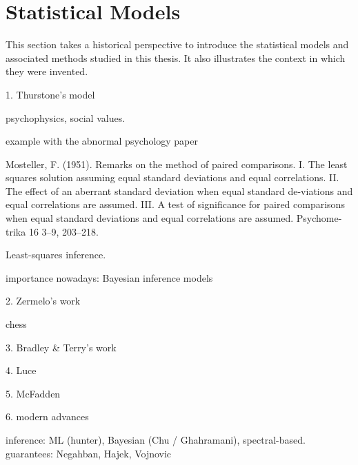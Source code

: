 \section{Statistical Models}
\label{in:sec:models}

This section takes a historical perspective to introduce the statistical models and associated methods studied in this thesis.
It also illustrates the context in which they were invented.

1. Thurstone's model

psychophysics, social values.

example with the abnormal psychology paper

Mosteller, F.
(1951). Remarks on the method of paired
comparisons. I. The least squares solution assuming equal
standard deviations and equal correlations. II. The effect
of an aberrant standard deviation when equal standard de-viations and equal correlations are assumed. III. A test of
significance for paired comparisons when equal standard
deviations and equal correlations are assumed.
Psychome-
trika
16
3–9, 203–218.

Least-squares inference.

importance nowadays: Bayesian inference models

2. Zermelo's work

chess

3. Bradley \& Terry's work

4. Luce

5. McFadden

6. modern advances

inference: ML (hunter), Bayesian (Chu / Ghahramani), spectral-based.
guarantees: Negahban, Hajek, Vojnovic

